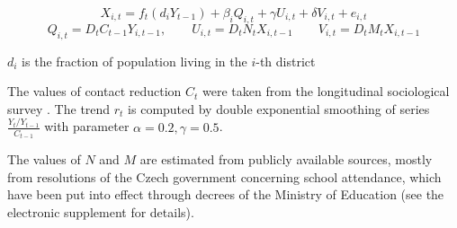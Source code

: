 \begin{equation}
X_{i,t} = f_t(d_i Y_{t-1}) + \beta_i Q_{i,t}
+ \gamma U_{i,t} + \delta V_{i,t} + e_{i,t}
\label{eq:x}
\end{equation}
$$
Q_{i,t}=D_tC_{t-1}Y_{i,t-1} , \qquad U_{i,t}=D_t N_t X_{i,t-1}
\qquad V_{i,t}=D_t M_t X_{i,t-1}
$$

 $d_i$ is the fraction of population living in the $i$-th district
 
 
 The values of contact reduction $C_t$ were taken from the longitudinal sociological survey \cite{paqcovid}. The trend $r_{t}$ is computed by double exponential smoothing of series
$\frac{Y_{t}/Y_{t-1}}{C_{t-1}}$ with parameter $\alpha=0.2,\gamma=0.5$.  


The values of $N$ and $M$ are estimated from publicly available
sources, mostly from resolutions of the Czech government concerning
school attendance, which have been put into effect through decrees
of the Ministry of Education (see the electronic supplement for
details).